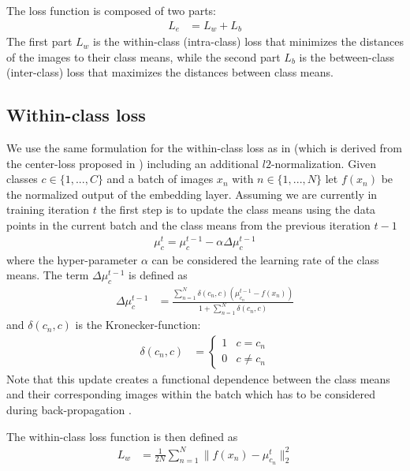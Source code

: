 \documentclass[10pt,twocolumn,letterpaper]{article}
\begin{document}
The loss function is composed of two parts:
\begin{align}
  \label{eq:centerLossCE}
  L_e &= L_{w} + L_{b}
\end{align}
The first part $L_{w}$ is the within-class (intra-class) loss that minimizes the distances of the images to their class means, while the second part $L_{b}$ is the between-class (inter-class) loss that maximizes the distances between class means.

\subsection{Within-class loss}
\label{section:intraLoss}
We use the same formulation for the within-class loss as in \cite{hanselmann2017deep} (which is derived from the center-loss proposed in \cite{wen2016discriminative}) including an additional $l2$-normalization. Given classes $c \in \{1,...,C\}$ and a batch of images $x_n$ with $n \in \{1,...,N\}$ let $f(x_n)$ be the normalized output of the embedding layer. Assuming we are currently in training iteration $t$ the first step is to update the class means using the data points in the current batch and the class means from the previous iteration $t-1$
\begin{align}
  \label{eq:centerUpdate}
  \mu_c^t = \mu_c^{t-1} - \alpha \Delta \mu_c^{t-1}
\end{align}
where the hyper-parameter $\alpha$ can be considered the learning rate of the class means. The term $\Delta \mu_c^{t-1}$ is defined as
\begin{align}
  \Delta \mu_c^{t-1} &= \frac{ \sum\limits_{n=1}^N \delta(c_n,c) (\mu_{c_n}^{t-1} - f(x_n)) } { 1 + \sum\limits_{n=1}^N \delta(c_n,c) }
\end{align}
and $\delta(c_n,c)$ is the Kronecker-function:
\begin{align}
  \delta(c_n,c) &=  \begin{cases} 1  & c = c_n \\ 0 & c \neq c_n \end{cases}
\end{align}
Note that this update creates a functional dependence between the class means and their corresponding images within the batch which has to be considered during back-propagation \cite{hanselmann2017deep}.

The within-class loss function is then defined as
\begin{align}
  \label{eq:intraLoss}
  L_{w} &= \frac{1}{2N} \sum_{n=1}^N  \lVert f(x_n) - \mu_{c_n}^t \rVert_2^2
\end{align}
\end{document}
